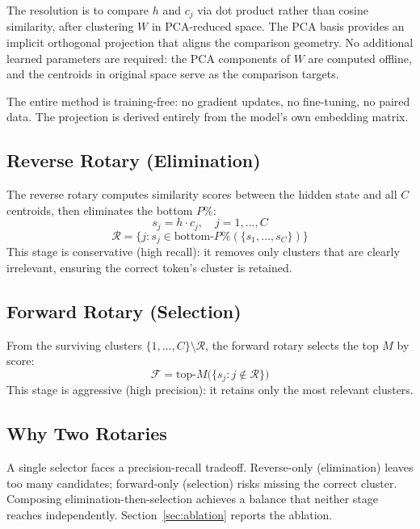 \documentclass[11pt]{article}
\begin{document}
The resolution is to compare $h$ and $c_j$ via dot product rather than cosine similarity, after clustering $W$ in PCA-reduced space. The PCA basis provides an implicit orthogonal projection that aligns the comparison geometry. No additional learned parameters are required: the PCA components of $W$ are computed offline, and the centroids in original space serve as the comparison targets.

The entire method is training-free: no gradient updates, no fine-tuning, no paired data. The projection is derived entirely from the model's own embedding matrix.

\subsection{Reverse Rotary (Elimination)}\label{sec:reverse}

The reverse rotary computes similarity scores between the hidden state and all $C$ centroids, then eliminates the bottom $P\%$:
\begin{equation}
s_j = h \cdot c_j, \quad j = 1, \dots, C
\end{equation}
\begin{equation}
\mathcal{R} = \{j : s_j \in \text{bottom-}P\%(\{s_1, \dots, s_C\})\}
\end{equation}
This stage is conservative (high recall): it removes only clusters that are clearly irrelevant, ensuring the correct token's cluster is retained.

\subsection{Forward Rotary (Selection)}\label{sec:forward}

From the surviving clusters $\{1, \dots, C\} \setminus \mathcal{R}$, the forward rotary selects the top $M$ by score:
\begin{equation}
\mathcal{F} = \text{top-}M\bigl(\{s_j : j \notin \mathcal{R}\}\bigr)
\end{equation}
This stage is aggressive (high precision): it retains only the most relevant clusters.

\subsection{Why Two Rotaries}

A single selector faces a precision-recall tradeoff. Reverse-only (elimination) leaves too many candidates; forward-only (selection) risks missing the correct cluster. Composing elimination-then-selection achieves a balance that neither stage reaches independently. Section~\ref{sec:ablation} reports the ablation.
\end{document}
